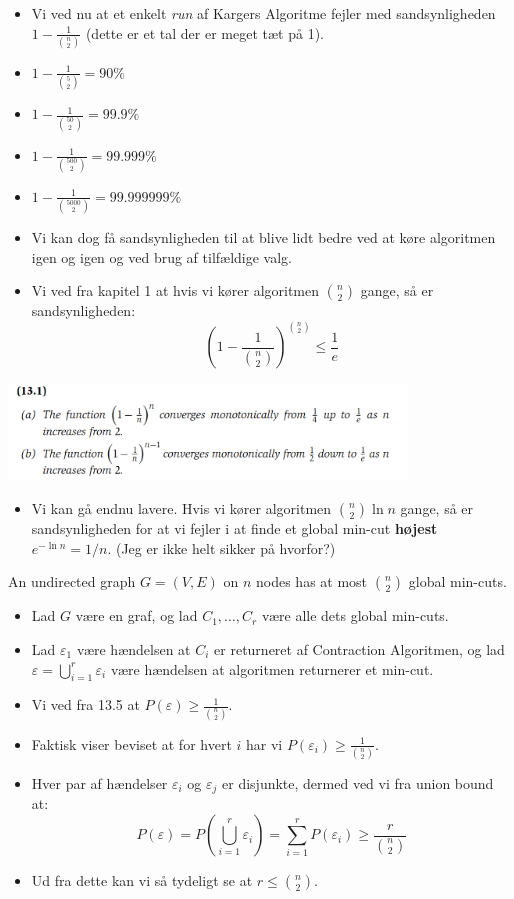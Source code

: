 \documentclass{beamer}
\begin{document}
\begin{frame}[allowframebreaks]
\begin{itemize}
\item Vi ved nu at et enkelt \textit{run} af Kargers Algoritme fejler med sandsynligheden $1- \frac{1}{\binom{n}{2}}$ (dette er et tal der er meget tæt på 1).
\item $1 - \frac{1}{\binom{5}{2}} = 90\%$
\item $1 - \frac{1}{\binom{50}{2}} = 99.9\%$
\item $1 - \frac{1}{\binom{500}{2}} = 99.999\%$
\item $1 - \frac{1}{\binom{5000}{2}} = 99.999999\%$
\item Vi kan dog få sandsynligheden til at blive lidt bedre ved at køre algoritmen igen og igen og ved brug af tilfældige valg. 
\item Vi ved fra kapitel 1 at hvis vi kører algoritmen $\binom{n}{2}$ gange, så er sandsynligheden:
\[ \left( 1- \frac{1}{\binom{n}{2}} \right)^{\binom{n}{2}}  \leq \frac{1}{e}\]
\end{itemize}

\includegraphics[width=300pt]{main-ab7f.png}

\begin{itemize}
\item Vi kan gå endnu lavere. Hvis vi kører algoritmen $\binom{n}{2} \ln n$ gange, så er sandsynligheden for at vi fejler i at finde et global min-cut \textbf{højest} $e^{-\ln n} = 1/n$. (Jeg er ikke helt sikker på hvorfor?)
\end{itemize}
 

\begin{theorem}[13.6]
An undirected graph $G = (V,E)$ on $n$ nodes has at most $\binom{n}{2}$ global min-cuts.
\end{theorem}
\begin{itemize}
\item Lad $G$ være en graf, og lad $C_{1}, \ldots, C_{r}$ være alle dets global min-cuts. 
\item Lad $\varepsilon_{1}$ være hændelsen at $C_{i}$ er returneret af Contraction Algoritmen, og lad $\varepsilon = \bigcup^{r}_{i=1}\varepsilon_{i}$ være hændelsen at algoritmen returnerer et min-cut.
\item Vi ved fra 13.5 at $P(\varepsilon) \geq \frac{1}{\binom{n}{2}}$.
\item Faktisk viser beviset at for hvert $i$ har vi $P(\varepsilon_{i}) \geq \frac{1}{\binom{n}{2}}$. 
\item Hver par af hændelser $\varepsilon_{i}$ og $\varepsilon_{j}$ er disjunkte, dermed ved vi fra union bound at:
  \[  P(\varepsilon) = P(\bigcup\limits_{i=1}^{r} \varepsilon_{i}) = \sum_{i=1}^{r}P(\varepsilon_{i}) \geq \frac{r}{\binom{n}{2}} \]
  \item Ud fra dette kan vi så tydeligt se at $r \leq \binom{n}{2}$.
\end{itemize}
\end{frame}
\end{document}
